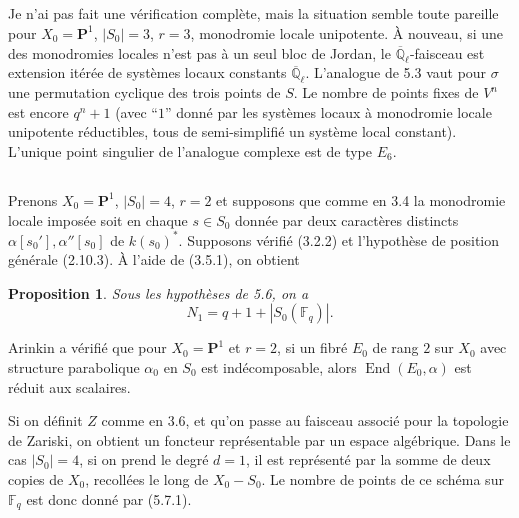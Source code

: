 \documentclass[11pt,a4paper]{article}
\theoremstyle{plain}
\newtheorem{proposition}[theorem]{Proposition}
\theoremstyle{definition}
\DeclareMathOperator{\End}{End}
\newcommand{\F}{\mathbb{F}}
\newcommand{\Ql}{\overline{\mathbb{Q}}_\ell}
\begin{document}
\subsection{}
Je n'ai pas fait une v\'erification compl\`ete, mais la situation semble toute pareille pour $X_0 = \mathbf{P}^1$, $|S_0| = 3$, $r = 3$, monodromie locale unipotente. \`A nouveau, si une des monodromies locales n'est pas \`a un seul bloc de Jordan, le $\Ql$-faisceau est extension it\'er\'ee de syst\`emes locaux constants $\Ql$. L'analogue de 5.3 vaut pour $\sigma$ une permutation cyclique des trois points de $S$. Le nombre de points fixes de $V^n$ est encore $q^n + 1$ (avec ``$1$'' donn\'e par les syst\`emes locaux \`a monodromie locale unipotente r\'eductibles, tous de semi-simplifi\'e un syst\`eme local constant). L'unique point singulier de l'analogue complexe est de type $E_6$.

\subsection{}
Prenons $X_0 = \mathbf{P}^1$, $|S_0| = 4$, $r = 2$ et supposons que comme en 3.4 la monodromie locale impos\'ee soit en chaque $s \in S_0$ donn\'ee par deux caract\`eres distincts $\alpha[s_0'], \alpha''[s_0]$ de $k(s_0)^*$. Supposons v\'erifi\'e (3.2.2) et l'hypoth\`ese de position g\'en\'erale (2.10.3). \`A l'aide de (3.5.1), on obtient

\begin{proposition}
Sous les hypoth\`eses de 5.6, on a
\begin{equation}
N_1 = q + 1 + |S_0(\F_q)|.
\tag{5.7.1}
\end{equation}
\end{proposition}

Arinkin a v\'erifi\'e que pour $X_0 = \mathbf{P}^1$ et $r = 2$, si un fibr\'e $E_0$ de rang $2$ sur $X_0$ avec structure parabolique $\alpha_0$ en $S_0$ est ind\'ecomposable, alors $\End(E_0, \alpha)$ est r\'eduit aux scalaires.

Si on d\'efinit $Z$ comme en 3.6, et qu'on passe au faisceau associ\'e pour la topologie de Zariski, on obtient un foncteur repr\'esentable par un espace alg\'ebrique. Dans le cas $|S_0| = 4$, si on prend le degr\'e $d = 1$, il est repr\'esent\'e par la somme de deux copies de $X_0$, recoll\'ees le long de $X_0 - S_0$. Le nombre de points de ce sch\'ema sur $\F_q$ est donc donn\'e par (5.7.1).
\end{document}
